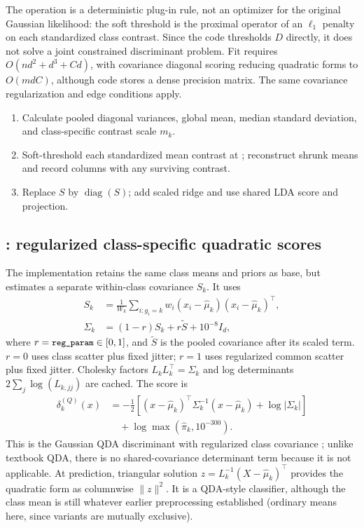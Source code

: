 \documentclass[conference]{IEEEtran}
\begin{document}
The operation is a deterministic plug-in rule, not an optimizer for the original Gaussian likelihood: the soft threshold is the proximal operator of an \(\ell_1\) penalty on each standardized class contrast. Since the code thresholds \(D\) directly, it does not solve a joint constrained discriminant problem. Fit requires \(O(nd^2+d^3+Cd)\), with covariance diagonal scoring reducing quadratic forms to \(O(mdC)\), although code stores a dense precision matrix. The same covariance regularization and edge conditions apply.
\begin{enumerate}
\item Calculate pooled diagonal variances, global mean, median standard deviation, and class-specific contrast scale \(m_k\).
\item Soft-threshold each standardized mean contrast at ; reconstruct shrunk means and record columns with any surviving contrast.
\item Replace \(S\) by \(\operatorname{diag}(S)\); add scaled ridge and use shared LDA score and projection.
\end{enumerate}

\subsection{: regularized class-specific quadratic scores}
The implementation retains the same class means and priors as base, but estimates a separate within-class covariance \(S_k\). It uses
\begin{equation}
\begin{aligned}
S_k&=\frac{1}{W_k}\sum_{i:g_i=k}w_i(x_i-\hat\mu_k)(x_i-\hat\mu_k)^\top,\\
\Sigma_k&=(1-r)S_k+r\tilde S+10^{-8}I_d,
\end{aligned}
\label{eq:qcov}
\end{equation}
where \(r=\texttt{\small reg\_param}\in[0,1]\), and \(\tilde S\) is the pooled covariance after its scaled  term. \(r=0\) uses class scatter plus fixed jitter; \(r=1\) uses regularized common scatter plus fixed jitter. Cholesky factors \(L_kL_k^\top=\Sigma_k\) and log determinants \(2\sum_j\log (L_{k,jj})\) are cached. The score is
\begin{equation}
\begin{split}
\delta_k^{(Q)}(x)&=-\tfrac12\left[(x-\hat\mu_k)^\top\Sigma_k^{-1}(x-\hat\mu_k)+\log|\Sigma_k|\right]\\
&\quad+\log\max(\hat\pi_k,10^{-300}).
\end{split}
\label{eq:qscore}
\end{equation}
This is the Gaussian QDA discriminant with regularized class covariance \cite{anderson1958}; unlike textbook QDA, there is no shared-covariance determinant term because it is not applicable. At prediction, triangular solution \(z=L_k^{-1}(X-\hat\mu_k)^\top\) provides the quadratic form as columnwise \(\|z\|^2\). It is a QDA-style classifier, although the class mean is still whatever earlier preprocessing established (ordinary means here, since variants are mutually exclusive).
\end{document}

